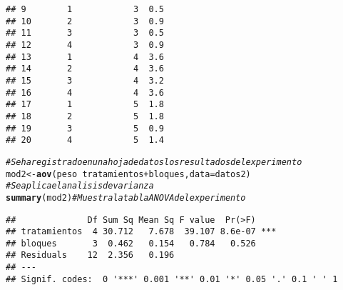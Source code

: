 \documentclass{article}\usepackage[]{graphicx}\usepackage[]{color}
\makeatletter
\newcommand{\hlcom}[1]{\textcolor[rgb]{0.678,0.584,0.686}{\textit{#1}}}%
\newcommand{\hlopt}[1]{\textcolor[rgb]{0,0,0}{#1}}%
\newcommand{\hlstd}[1]{\textcolor[rgb]{0.345,0.345,0.345}{#1}}%
\newcommand{\hlkwb}[1]{\textcolor[rgb]{0.69,0.353,0.396}{#1}}%
\newcommand{\hlkwc}[1]{\textcolor[rgb]{0.333,0.667,0.333}{#1}}%
\newcommand{\hlkwd}[1]{\textcolor[rgb]{0.737,0.353,0.396}{\textbf{#1}}}%
\newenvironment{kframe}{%
 \def\at@end@of@kframe{}%
 \ifinner\ifhmode%
  \def\at@end@of@kframe{\end{minipage}}%
  \begin{minipage}{\columnwidth}%
 \fi\fi%
 \def\FrameCommand##1{\hskip\@totalleftmargin \hskip-\fboxsep
 \colorbox{shadecolor}{##1}\hskip-\fboxsep
     \hskip-\linewidth \hskip-\@totalleftmargin \hskip\columnwidth}%
 \MakeFramed {\advance\hsize-\width
   \@totalleftmargin\z@ \linewidth\hsize
   \@setminipage}}%
 {\par\unskip\endMakeFramed%
 \at@end@of@kframe}
\newenvironment{knitrout}{}{} %
\makeatother
\begin{document}
\begin{knitrout}
\begin{kframe}
\begin{verbatim}
## 9        1            3  0.5
## 10       2            3  0.9
## 11       3            3  0.5
## 12       4            3  0.9
## 13       1            4  3.6
## 14       2            4  3.6
## 15       3            4  3.2
## 16       4            4  3.6
## 17       1            5  1.8
## 18       2            5  1.8
## 19       3            5  0.9
## 20       4            5  1.4
\end{verbatim}
\begin{alltt}
\hlcom{#Se ha registrado en una hoja de datos los resultados del experimento}
\hlstd{mod2}\hlkwb{<-}\hlkwd{aov}\hlstd{(peso} \hlopt{~} \hlstd{tratamientos} \hlopt{+} \hlstd{bloques,}\hlkwc{data} \hlstd{= datos2)}
\hlcom{# Se aplica el analisis de varianza}
\hlkwd{summary}\hlstd{(mod2)} \hlcom{# Muestra la tabla ANOVA del experimento}
\end{alltt}
\begin{verbatim}
##              Df Sum Sq Mean Sq F value  Pr(>F)    
## tratamientos  4 30.712   7.678  39.107 8.6e-07 ***
## bloques       3  0.462   0.154   0.784   0.526    
## Residuals    12  2.356   0.196                    
## ---
## Signif. codes:  0 '***' 0.001 '**' 0.01 '*' 0.05 '.' 0.1 ' ' 1
\end{verbatim}
\end{kframe}
\end{knitrout}
\end{document}
